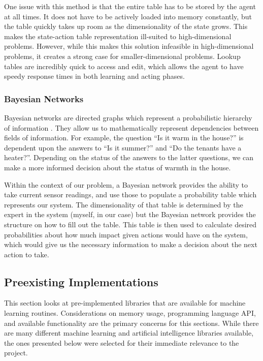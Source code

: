One issue with this method is that the entire table has to be stored by the agent at all times.
It does not have to be actively loaded into memory constantly, but the table quickly takes up room as the dimensionality of the state grows.
This makes the state-action table representation ill-suited to high-dimensional problems.
However, while this makes this solution infeasible in high-dimensional problems, it creates a strong case for smaller-dimensional problems.
Lookup tables are incredibly quick to access and edit, which allows the agent to have speedy response times in both learning and acting phases.

\subsubsection{Bayesian Networks}
Bayesian networks are directed graphs which represent a probabilistic hierarchy of information \cite{RussellNorvig}.
They allow us to mathematically represent dependencies between fields of information.
For example, the question ``Is it warm in the house?'' is dependent upon the answers to ``Is it summer?'' and ``Do the tenants have a heater?''.
Depending on the status of the answers to the latter questions, we can make a more informed decision about the status of warmth in the house.

Within the context of our problem, a Bayesian network provides the ability to take current sensor readings, and use those to populate a probability table which represents our system.
The dimensionality of that table is determined by the expert in the system (myself, in our case) but the Bayesian network provides the structure on how to fill out the table.
This table is then used to calculate desired probabilities about how much impact given actions would have on the system, which would give us the necessary information to make a decision about the next action to take.

\subsection{Preexisting Implementations}
This section looks at pre-implemented libraries that are available for machine learning routines.
Considerations on memory usage, programming language API, and available functionality are the primary concerns for this sections.
While there are many different machine learning and artificial intelligence libraries available, the ones presented below were selected for their immediate relevance to the project.
